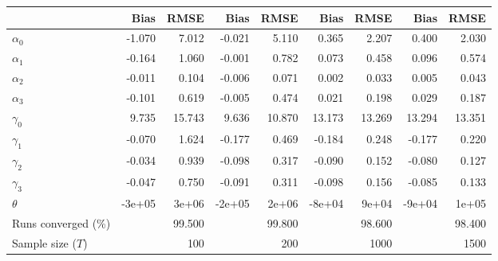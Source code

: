 
\begin{tabular}[t]{lrrrrrrrr}
\toprule
  & Bias & RMSE & Bias & RMSE & Bias & RMSE & Bias & RMSE\\
\midrule
$\alpha_{0}$ & -1.070 & 7.012 & -0.021 & 5.110 & 0.365 & 2.207 & 0.400 & 2.030\\
$\alpha_{1}$ & -0.164 & 1.060 & -0.001 & 0.782 & 0.073 & 0.458 & 0.096 & 0.574\\
$\alpha_{2}$ & -0.011 & 0.104 & -0.006 & 0.071 & 0.002 & 0.033 & 0.005 & 0.043\\
$\alpha_{3}$ & -0.101 & 0.619 & -0.005 & 0.474 & 0.021 & 0.198 & 0.029 & 0.187\\
$\gamma_{0}$ & 9.735 & 15.743 & 9.636 & 10.870 & 13.173 & 13.269 & 13.294 & 13.351\\
$\gamma_{1}$ & -0.070 & 1.624 & -0.177 & 0.469 & -0.184 & 0.248 & -0.177 & 0.220\\
$\gamma_{2}$ & -0.034 & 0.939 & -0.098 & 0.317 & -0.090 & 0.152 & -0.080 & 0.127\\
$\gamma_{3}$ & -0.047 & 0.750 & -0.091 & 0.311 & -0.098 & 0.156 & -0.085 & 0.133\\
$\theta$ & -3e+05 & 3e+06 & -2e+05 & 2e+06 & -8e+04 & 9e+04 & -9e+04 & 1e+05\\
Runs converged (\%) &  & 99.500 &  & 99.800 &  & 98.600 &  & 98.400\\
Sample size ($T$) &  & 100 &  & 200 &  & 1000 &  & 1500\\
\bottomrule
\end{tabular}
